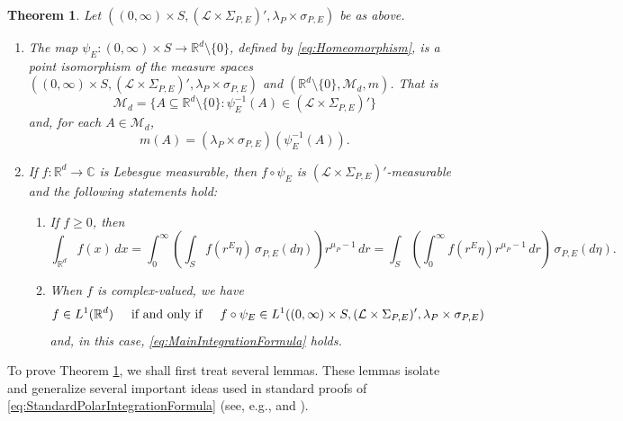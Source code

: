 \documentclass[11pt]{article}
\newtheorem{theorem}{Theorem}[section]
\theoremstyle{remark}
\begin{document}
\begin{theorem}\label{thm:MainIntegrationFormula}
Let $((0,\infty)\times S,(\mathcal{L}\times\Sigma_{P,E})',\lambda_P\times\sigma_{P,E})$ be as above.
\begin{enumerate}
\item\label{item:MainIntegrationFormula1} The map $\psi_E: (0,\infty)\times S\to\mathbb{R}^d\setminus\{0\}$, defined by \eqref{eq:Homeomorphism}, is a point isomorphism of the measure spaces $((0,\infty)\times S,(\mathcal{L}\times\Sigma_{P,E})',\lambda_P\times\sigma_{P,E})$ and $(\mathbb{R}^d\setminus\{0\},\mathcal{M}_d,m)$. That is
\begin{equation*}
\mathcal{M}_d=\{A\subseteq \mathbb{R}^d\setminus\{0\}:\psi_E^{-1}(A)\in(\mathcal{L}\times\Sigma_{P,E})'\}
\end{equation*}
and, for each $A\in\mathcal{M}_d$,
\begin{equation*}
m(A)=(\lambda_P\times\sigma_{P,E})(\psi_E^{-1}(A)).
\end{equation*}
\item\label{item:MainintegrationFormula2} If $f:\mathbb{R}^d\to\mathbb{C}$ is Lebesgue measurable, then $f\circ \psi_E$ is $(\mathcal{L}\times\Sigma_{P,E})'$-measurable and the following statements hold:
\begin{enumerate}
\item If $f\geq 0$, then
\begin{equation}\label{eq:MainIntegrationFormula}
\int_{\mathbb{R}^d}f(x)\,dx=\int_0^\infty\left(\int_S f(r^E\eta)\,\sigma_{P,E}(d\eta)\right)r^{\mu_P-1}\,dr=\int_S\left(\int_0^\infty f(r^E\eta)r^{\mu_P-1}\,dr\right)\,\sigma_{P,E}(d\eta).
\end{equation}
\item When $f$ is complex-valued, we have 
\begin{equation*}f\in L^1(\mathbb{R}^d)\hspace{.5cm}\mbox{if and only if}\hspace{0.5cm}f\circ\psi_E\in L^1((0,\infty)\times S,(\mathcal{L}\times \Sigma_{P,E})',\lambda_P\times\sigma_{P,E})
\end{equation*}
and, in this case, \eqref{eq:MainIntegrationFormula} holds.
\end{enumerate}
\end{enumerate}
\end{theorem}

\noindent To prove Theorem \ref{thm:MainIntegrationFormula}, we shall first treat several lemmas. These lemmas isolate and generalize several important ideas used in standard proofs of \eqref{eq:StandardPolarIntegrationFormula} (see, e.g., \cite{folland_real_2013} and \cite{stein_real_2009}). 
\end{document}
